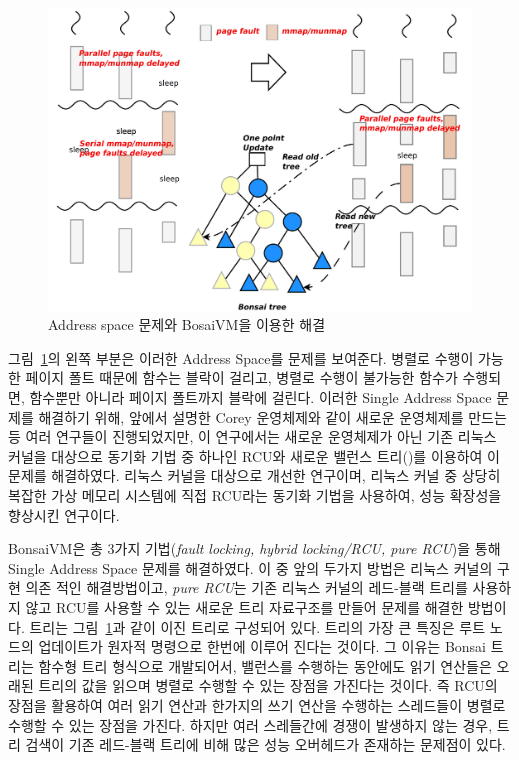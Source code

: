 \begin{figure}[h!]
    \centering
    \includegraphics[width=1\textwidth]{fig/bosaivm/bosaivm}
    \caption{Address space 문제와 BosaiVM을 이용한 해결}
  \label{fig:bonsaivm}
\end{figure}

그림~\ref{fig:bonsaivm}의 왼쪽 부분은 이러한 Address Space를 문제를 보여준다. 
병렬로 수행이 가능한 페이지 폴트 때문에  함수는 블락이 걸리고, 병렬로 
수행이 불가능한  함수가 수행되면,  함수뿐만 아니라 
페이지 폴트까지 블락에 걸린다.
이러한 Single Address Space 문제를 해결하기 위해, 앞에서 설명한 Corey 운영체제와 같이 새로운 운영체제를 
만드는 등 여러 연구들이 진행되었지만, 이 연구에서는 새로운 운영체제가 아닌 기존 리눅스 커널을 대상으로 
동기화 기법 중 하나인 RCU와 새로운 밸런스 트리()를 이용하여 이 문제를 해결하였다. 
리눅스 커널을 대상으로 개선한 연구이며, 
리눅스 커널 중 상당히 복잡한 가상 메모리 시스템에 직접 RCU라는 동기화 기법을 사용하여, 
성능 확장성을 향상시킨 연구이다.
 
BonsaiVM은 총 3가지 기법(\textit{fault locking, hybrid locking/RCU, pure RCU})을 통해
Single Address Space 문제를 해결하였다.
이 중 앞의 두가지 방법은 리눅스 커널의 구현 의존 적인 해결방법이고, \textit{pure RCU}는 
기존 리눅스 커널의 레드-블랙 트리를 사용하지 않고 RCU를 사용할 수 있는 
새로운  트리 자료구조를 만들어 문제를 해결한 방법이다. 
 트리는 그림~\ref{fig:bonsaivm}과 같이 이진 트리로 구성되어 있다. 
 트리의 가장 큰 특징은 루트 노드의 업데이트가 원자적 명령으로 한번에 이루어 진다는 것이다. 
그 이유는 Bonsai 트리는 함수형 트리 형식으로 개발되어서, 밸런스를 수행하는 동안에도 읽기 연산들은 
오래된 트리의 값을 읽으며 병렬로 수행할 수 있는 장점을 가진다는 것이다.
즉 RCU의 장점을 활용하여 여러 읽기 연산과 한가지의 쓰기 연산을 수행하는 스레드들이 병렬로 수행할 수 
있는 장점을 가진다. 
하지만 여러 스레들간에 경쟁이 발생하지 않는 경우, 트리 검색이 기존 레드-블랙 트리에 비해 많은 성능 
오버헤드가 존재하는 문제점이 있다. 
 
